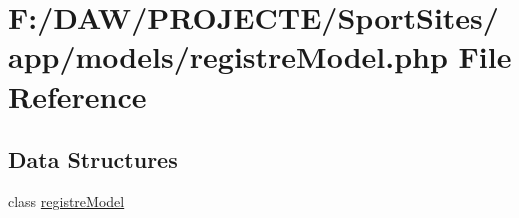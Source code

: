 \hypertarget{registre_model_8php}{}\section{F\+:/\+D\+A\+W/\+P\+R\+O\+J\+E\+C\+T\+E/\+Sport\+Sites/app/models/registre\+Model.php File Reference}
\label{registre_model_8php}
\subsection*{Data Structures}
\begin{DoxyCompactItemize}
\item 
class \hyperlink{classregistre_model}{registre\+Model}
\end{DoxyCompactItemize}
